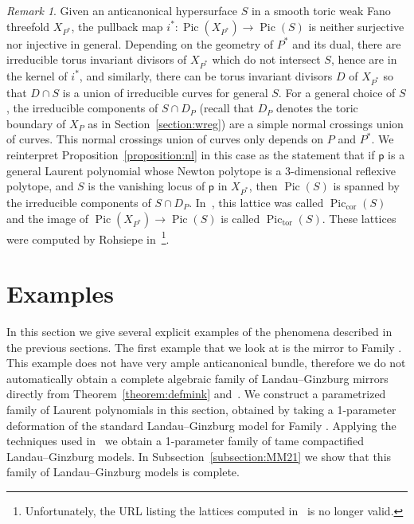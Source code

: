 \documentclass[10pt]{amsart}
\numberwithin{equation}{section}
\theoremstyle{plain}
\theoremstyle{definition}
\theoremstyle{remark}
\newtheorem{remark}[theorem]{Remark}
\DeclareMathOperator{\Pic}{Pic}
\begin{document}
\begin{remark}
  Given an anticanonical hypersurface \(S\) in a smooth toric weak Fano threefold \(X_{P^*}\), the pullback map \(i^*:\Pic(X_{P^*})\rightarrow \Pic(S)\) is neither surjective nor injective in general. Depending on the geometry of \(P^*\) and its dual, there are irreducible torus invariant divisors of \(X_{P^*}\) which do not intersect \(S\), hence are in the kernel of \(i^*\), and similarly, there can be torus invariant divisors \(D\) of \(X_{P^*}\) so that \(D\cap S\) is a union of irreducible curves for general \(S\). For a general choice of \(S\), the irreducible components of \(S \cap D_P\) (recall that \(D_P\) denotes the toric boundary of \(X_P\) as in Section~\ref{section:wreg}) are a simple normal crossings union of curves. This normal crossings union of curves only depends on \(P\) and \(P^*\). We reinterpret Proposition~\ref{proposition:nl} in this case as the statement that if \(\mathsf{p}\) is a general Laurent polynomial whose Newton polytope is a 3-dimensional reflexive polytope, and \(S\) is the vanishing locus of \(\mathsf{p}\) in \(X_{P^*}\), then \(\Pic(S)\) is spanned by the irreducible components of \(S \cap D_P\). In~\cite{whitcher2015reflexive}, this lattice was called \(\Pic_\mathrm{cor}(S)\) and the image of \(\Pic(X_{P^*})\rightarrow \Pic(S)\) is called \(\Pic_\mathrm{tor}(S)\). These lattices were computed by Rohsiepe in~\cite{rohsiepe2004lattice}\footnote{Unfortunately, the URL listing the lattices computed in~\cite{rohsiepe2004lattice} is no longer valid.}.
\end{remark}


\section{Examples}\label{section:ex}

In this section we give several explicit examples of the phenomena described in the previous sections. The first example that we look at is the mirror to Family . This example does not have very ample anticanonical bundle, therefore we do not automatically obtain a complete algebraic family of Landau--Ginzburg mirrors directly from Theorem~\ref{theorem:defmink} and~\cite{przyjalkowski2017compactification}. We construct a parametrized family of Laurent polynomials in this section, obtained by taking a 1-parameter deformation of the standard Landau--Ginzburg model for Family . Applying the techniques used in~\cite[Subsection~2.1]{cheltsov2018katzarkov} we obtain a 1-parameter family of tame compactified Landau--Ginzburg models. In Subsection~\ref{subsection:MM21} we show that this family of Landau--Ginzburg models is complete.
\end{document}
